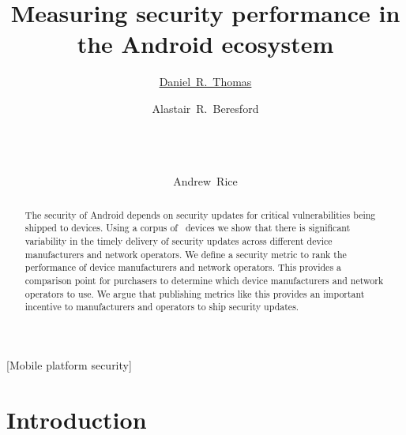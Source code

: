 \documentclass{sig-alternate}
\begin{document}
%

\title{Measuring security performance in the Android ecosystem}

\author{
\href{http://orcid.org/0000-0001-8936-0683}{Daniel~R.~Thomas}
\and
Alastair~R.~Beresford\\
       \\
       \\
       \\
\and
Andrew~Rice
}


\maketitle

\begin{abstract}
The security of Android depends on security updates for critical vulnerabilities  being shipped to devices.
Using a corpus of \daNumOSDevices\ devices we show that there is significant variability in the timely delivery of security updates across different device manufacturers and network operators.
We define a security metric to rank the performance of device manufacturers and network operators.
This provides a comparison point for purchasers to determine which device manufacturers and network operators to use.
We argue that publishing metrics like this provides an important incentive to manufacturers and operators to ship security updates.
\end{abstract}

[Mobile platform security]



\section{Introduction}
\end{document}
